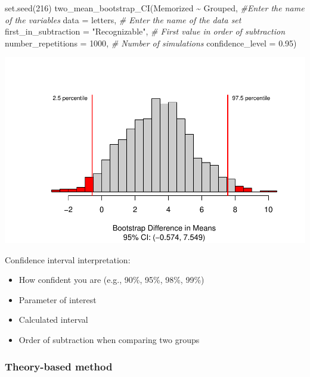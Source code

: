 \documentclass[
]{report}
\newenvironment{Shaded}{\begin{snugshade}}{\end{snugshade}}
\newcommand{\AttributeTok}[1]{\textcolor[rgb]{0.77,0.63,0.00}{#1}}
\newcommand{\CommentTok}[1]{\textcolor[rgb]{0.56,0.35,0.01}{\textit{#1}}}
\newcommand{\DecValTok}[1]{\textcolor[rgb]{0.00,0.00,0.81}{#1}}
\newcommand{\FloatTok}[1]{\textcolor[rgb]{0.00,0.00,0.81}{#1}}
\newcommand{\FunctionTok}[1]{\textcolor[rgb]{0.00,0.00,0.00}{#1}}
\newcommand{\NormalTok}[1]{#1}
\newcommand{\SpecialCharTok}[1]{\textcolor[rgb]{0.00,0.00,0.00}{#1}}
\newcommand{\StringTok}[1]{\textcolor[rgb]{0.31,0.60,0.02}{#1}}
\begin{document}
\begin{Shaded}
\begin{Highlighting}[]
\FunctionTok{set.seed}\NormalTok{(}\DecValTok{216}\NormalTok{)}
\FunctionTok{two\_mean\_bootstrap\_CI}\NormalTok{(Memorized }\SpecialCharTok{\textasciitilde{}}\NormalTok{ Grouped, }\CommentTok{\#Enter the name of the variables}
                      \AttributeTok{data =}\NormalTok{ letters,  }\CommentTok{\# Enter the name of the data set}
                      \AttributeTok{first\_in\_subtraction =} \StringTok{"Recognizable"}\NormalTok{, }\CommentTok{\# First value in order of subtraction}
                      \AttributeTok{number\_repetitions =} \DecValTok{1000}\NormalTok{,  }\CommentTok{\# Number of simulations}
                      \AttributeTok{confidence\_level =} \FloatTok{0.95}\NormalTok{)}
\end{Highlighting}
\end{Shaded}

\begin{center}\includegraphics[width=0.7\linewidth]{12-LN012-1ofeach_files/figure-latex/unnamed-chunk-7-1} \end{center}

Confidence interval interpretation:

\begin{itemize}
\item
  How confident you are (e.g., 90\%, 95\%, 98\%, 99\%)
\item
  Parameter of interest
\item
  Calculated interval
\item
  Order of subtraction when comparing two groups
\end{itemize}

\vspace{0.8in}

\hypertarget{theory-based-method-5}{%
\subsubsection*{Theory-based method}\label{theory-based-method-5}}
\end{document}
